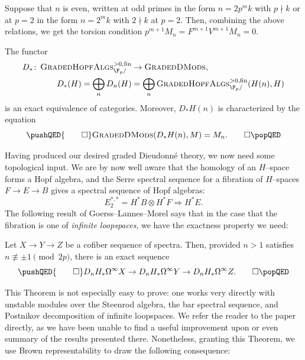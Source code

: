 \begin{remark}
Suppose that \(n\) is even, written at odd primes in the form \(n = 2p^m k\) with \(p \nmid k\) or at \(p = 2\) in the form \(n = 2^m k\) with \(2 \nmid k\) at \(p = 2\).
Then, combining the above relations, we get the torsion condition \(p^{m+1} M_n = F^{m+1} V^{m+1} M_n = 0\).
\end{remark}

\begin{theorem}
The functor
\begin{align*}
D_*\co \CatOf{GradedHopfAlgs}^{>0, \fin}_{\F_p/} & \to \CatOf{GradedDMods}, \\
D_*(H) = \bigoplus_n D_n(H) & = \bigoplus_n \CatOf{GradedHopfAlgs}^{>0, \fin}_{\F_p/}(H(n), H)
\end{align*}
is an exact equivalence of categories.
Moreover, \(D_* H(n)\) is characterized by the equation
\[\pushQED{\qed}
\CatOf{GradedDMods}(D_* H(n), M) = M_n. \qedhere
\popQED\]
\end{theorem}

Having produced our desired graded Dieudonn\'e theory, we now need some topological input.
We are by now well aware that the homology of an \(H\)--space forms a Hopf algebra, and the Serre spectral sequence for a fibration of \(H\)--spaces \(F \to E \to B\) gives a spectral sequence of Hopf algebras: \[E_2^{*, *} = H^* B \otimes H^* F \Rightarrow H^* E.\]
The following result of Goerss--Lannes--Morel says that in the case that the fibration is one of \emph{infinite loopspaces}, we have the exactness property we need:

\begin{theorem}
Let \(X \to Y \to Z\) be a cofiber sequence of spectra.
Then, provided \(n > 1\) satisfies \(n \not\equiv \pm 1 \pmod{2p}\), there is an exact sequence
\[\pushQED{\qed}
D_n H_* \Loops^\infty X \to D_n H_* \Loops^\infty Y \to D_n H_* \Loops^\infty Z. \qedhere
\popQED\]
\end{theorem}

\noindent This Theorem is not especially easy to prove: one works very directly with unstable modules over the Steenrod algebra, the bar spectral sequence, and Postnikov decomposition of infinite loopspaces.
We refer the reader to the paper directly, as we have been unable to find a useful improvement upon or even summary of the results presented there.
Nonetheless, granting this Theorem, we use Brown representability to draw the following consequence:

